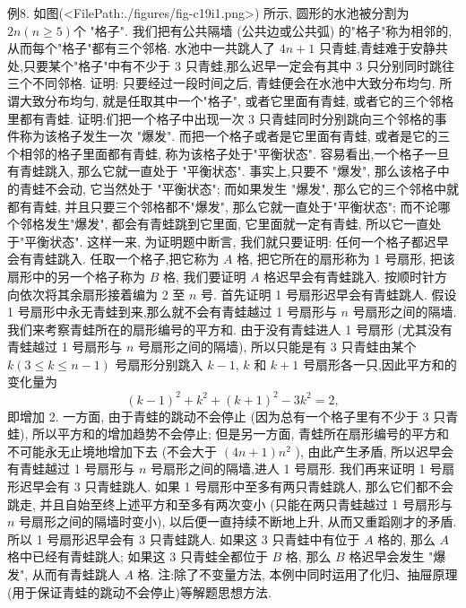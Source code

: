 例8. 如图(<FilePath:./figures/fig-c19i1.png>) 所示, 圆形的水池被分割为 $2 n(n \geqslant 5)$个 "格子". 我们把有公共隔墙 (公共边或公共弧) 的"格子"称为相邻的, 从而每个"格子"都有三个邻格.
水池中一共跳人了 $4 n+1$ 只青蛙,青蛙难于安静共处,只要某个"格子"中有不少于 3 只青蛙,那么迟早一定会有其中 3 只分别同时跳往三个不同邻格.
证明: 只要经过一段时间之后, 青蛙便会在水池中大致分布均匀.
所谓大致分布均匀, 就是任取其中一个"格子", 或者它里面有青蛙, 或者它的三个邻格里都有青蛙.
证明:们把一个格子中出现一次 3 只青蛙同时分别跳向三个邻格的事件称为该格子发生一次 "爆发". 而把一个格子或者是它里面有青蛙, 或者是它的三个相邻的格子里面都有青蛙, 称为该格子处于"平衡状态".
容易看出,一个格子一旦有青蛙跳入, 那么它就一直处于 "平衡状态". 事实上,只要不 "爆发", 那么该格子中的青蛙不会动, 它当然处于 "平衡状态"; 而如果发生 "爆发", 那么它的三个邻格中就都有青蛙, 并且只要三个邻格都不"爆发", 那么它就一直处于"平衡状态"; 而不论哪个邻格发生"爆发", 都会有青蛙跳到它里面, 它里面就一定有青蛙, 所以它一直处于"平衡状态".
这样一来, 为证明题中断言, 我们就只要证明: 任何一个格子都迟早会有青蛙跳入.
任取一个格子,把它称为 $A$ 格, 把它所在的扇形称为 1 号扇形, 把该扇形中的另一个格子称为 $B$ 格, 我们要证明 $A$ 格迟早会有青蛙跳入.
按顺时针方向依次将其余扇形接着编为 2 至 $n$ 号.
首先证明 1 号扇形迟早会有青蛙跳人.
假设 1 号扇形中永无青蛙到来,那么就不会有青蛙越过 1 号扇形与 $n$ 号扇形之间的隔墙.
我们来考察青蛙所在的扇形编号的平方和.
由于没有青蛙进人 1 号扇形 (尤其没有青蛙越过 1 号扇形与 $n$ 号扇形之间的隔墙), 所以只能是有 3 只青蛙由某个 $k(3 \leqslant k \leqslant n-1)$ 号扇形分别跳入 $k-1$, $k$ 和 $k+1$ 号扇形各一只,因此平方和的变化量为
$$
(k-1)^2+k^2+(k+1)^2-3 k^2=2,
$$
即增加 2. 一方面, 由于青蛙的跳动不会停止 (因为总有一个格子里有不少于 3 只青蛙), 所以平方和的增加趋势不会停止; 但是另一方面, 青蛙所在扇形编号的平方和不可能永无止境地增加下去 (不会大于 $(4 n+1) n^2$ ), 由此产生矛盾, 所以迟早会有青蛙越过 1 号扇形与 $n$ 号扇形之间的隔墙,进人 1 号扇形.
我们再来证明 1 号扇形迟早会有 3 只青蛙跳人.
如果 1 号扇形中至多有两只青蛙跳人, 那么它们都不会跳走, 并且自始至终上述平方和至多有两次变小 (只能在两只青蛙越过 1 号扇形与 $n$ 号扇形之间的隔墙时变小), 以后便一直持续不断地上升, 从而又重蹈刚才的矛盾.
所以 1 号扇形迟早会有 3 只青蛙跳人.
如果这 3 只青蛙中有位于 $A$ 格的, 那么 $A$ 格中已经有青蛙跳人; 如果这 3 只青蛙全都位于 $B$ 格, 那么 $B$ 格迟早会发生 "爆发", 从而有青蛙跳人 $A$ 格.
注:除了不变量方法, 本例中同时运用了化归、抽屉原理(用于保证青蛙的跳动不会停止)等解题思想方法.


